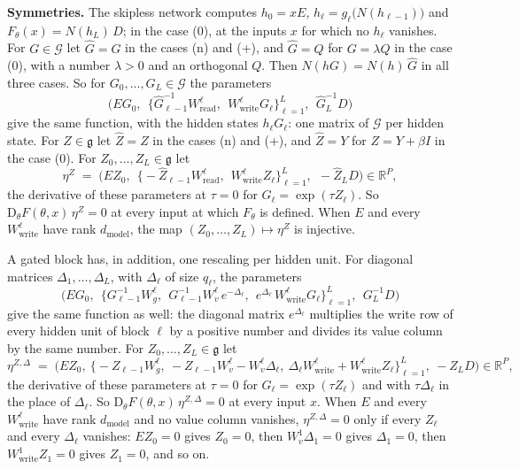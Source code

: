 \documentclass[10pt]{article}
\theoremstyle{definition}
\theoremstyle{remark}
\newcommand{\R}{\mathbb{R}}
\newcommand{\Wread}{W_{\mathrm{read}}}
\newcommand{\Wwrite}{W_{\mathrm{write}}}
\newcommand{\dm}{d_{\mathrm{model}}}
\newcommand{\Der}{\mathrm{D}}
\newcommand{\G}{\mathcal{G}}
\newcommand{\para}[1]{\smallskip\noindent\textbf{#1}\hspace{0.5em}}
\begin{document}
\para{Symmetries.} The skipless network computes $h_0 = xE$, $h_\ell = g_\ell\big(N(h_{\ell-1})\big)$ and $F_\theta(x) = N(h_L)\,D$; in the case (0), at the inputs $x$ for which no $h_\ell$ vanishes. For $G \in \G$ let $\widehat G = G$ in the cases (n) and (+), and $\widehat G = Q$ for $G = \lambda Q$ in the case (0), with a number $\lambda > 0$ and an orthogonal $Q$. Then $N(hG) = N(h)\,\widehat G$ in all three cases. So for $G_0, \dots, G_L \in \G$ the parameters
\[
\Big(EG_0,\ \ \big\{\widehat G_{\ell-1}^{-1}\Wread^{\ell},\ \ \Wwrite^{\ell}G_\ell\big\}_{\ell=1}^{L},\ \ \widehat G_L^{-1}D\Big)
\]
give the same function, with the hidden states $h_\ell G_\ell$: one matrix of $\G$ per hidden state. For $Z \in \mathfrak g$ let $\widehat Z = Z$ in the cases (n) and (+), and $\widehat Z = Y$ for $Z = Y + \beta I$ in the case (0). For $Z_0, \dots, Z_L \in \mathfrak g$ let
\begin{equation}\label{eq:e0eta}
\eta^{Z} \;=\; \Big(EZ_0,\ \ \big\{-\widehat Z_{\ell-1}\Wread^{\ell},\ \ \Wwrite^{\ell}Z_\ell\big\}_{\ell=1}^{L},\ \ -\widehat Z_LD\Big) \in \R^P ,
\end{equation}
the derivative of these parameters at $\tau = 0$ for $G_\ell = \exp(\tau Z_\ell)$. So $\Der_\theta F(\theta, x)\,\eta^{Z} = 0$ at every input at which $F_\theta$ is defined. When $E$ and every $\Wwrite^{\ell}$ have rank $\dm$, the map $(Z_0, \dots, Z_L) \mapsto \eta^{Z}$ is injective.

A gated block has, in addition, one rescaling per hidden unit. For diagonal matrices $\Delta_1, \dots, \Delta_L$, with $\Delta_\ell$ of size $q_\ell$, the parameters
\[
\Big(EG_0,\ \ \big\{G_{\ell-1}^{-1}W_g^{\ell},\ \ G_{\ell-1}^{-1}W_v^{\ell}\,e^{-\Delta_\ell},\ \ e^{\Delta_\ell}\,\Wwrite^{\ell}G_\ell\big\}_{\ell=1}^{L},\ \ G_L^{-1}D\Big)
\]
give the same function as well: the diagonal matrix $e^{\Delta_\ell}$ multiplies the write row of every hidden unit of block $\ell$ by a positive number and divides its value column by the same number. For $Z_0, \dots, Z_L \in \mathfrak g$ let
\begin{equation}\label{eq:gteta}
\eta^{Z,\Delta} \;=\; \Big(EZ_0,\ \big\{-Z_{\ell-1}W_g^{\ell},\ -Z_{\ell-1}W_v^{\ell} - W_v^{\ell}\Delta_\ell,\ \Delta_\ell\Wwrite^{\ell} + \Wwrite^{\ell}Z_\ell\big\}_{\ell=1}^{L},\ -Z_LD\Big) \in \R^P ,
\end{equation}
the derivative of these parameters at $\tau = 0$ for $G_\ell = \exp(\tau Z_\ell)$ and with $\tau\Delta_\ell$ in the place of $\Delta_\ell$. So $\Der_\theta F(\theta, x)\,\eta^{Z,\Delta} = 0$ at every input $x$. When $E$ and every $\Wwrite^{\ell}$ have rank $\dm$ and no value column vanishes, $\eta^{Z,\Delta} = 0$ only if every $Z_\ell$ and every $\Delta_\ell$ vanishes: $EZ_0 = 0$ gives $Z_0 = 0$, then $W_v^{1}\Delta_1 = 0$ gives $\Delta_1 = 0$, then $\Wwrite^{1}Z_1 = 0$ gives $Z_1 = 0$, and so on.
\end{document}
